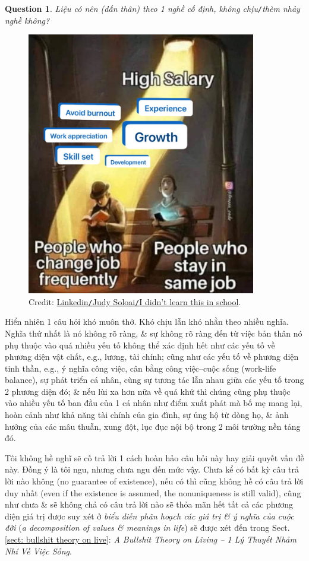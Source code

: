 \documentclass[12pt,oneside]{book}
\newtheorem{question}{Question}
\begin{document}
\begin{question}
	Liệu có nên (dấn thân) theo 1 nghề cố định, không chịu{\tt/}thèm nhảy nghề không? 
\end{question}

\begin{figure}[H]
	\centering
	\includegraphics[width = 10cm]{high_salary}
	\caption{Credit: \href{https://www.linkedin.com/posts/judy-soloai_i-didnt-learn-this-in-school-i-learned-activity-7089014937494179840-jTze/}{Linkedin{\tt/}Judy Soloai{\tt/}I didn't learn this in school}.}
\end{figure}
Hiển nhiên 1 câu hỏi khó muôn thở. Khó chịu lẫn khó nhằn theo nhiều nghĩa. Nghĩa thứ nhất là nó không rõ ràng, \& sự không rõ ràng đến từ việc bản thân nó phụ thuộc vào quá nhiều yếu tố không thể xác định hết như các yếu tố về phương diện vật chất, e.g., lương, tài chính; cũng như các yếu tố về phương diện tinh thần, e.g., ý nghĩa công việc, cân bằng công việc--cuộc sống (work-life balance), sự phát triển cá nhân, cùng sự tương tác lẫn nhau giữa các yếu tố trong 2 phương diện đó; \& nếu lùi xa hơn nữa về quá khứ thì chúng cũng phụ thuộc vào nhiều yếu tố ban đầu của 1 cá nhân như điểm xuất phát mà bố mẹ mang lại, hoàn cảnh như khả năng tài chính của gia đình, sự ủng hộ từ dòng họ, \& ảnh hưởng của các mâu thuẫn, xung đột, lục đục nội bộ trong 2 môi trường nền tảng đó.

Tôi không hề nghĩ sẽ cố trả lời 1 cách hoàn hảo câu hỏi này hay giải quyết vấn đề này. Đồng ý là tôi ngu, nhưng chưa ngu đến mức vậy. Chưa kể có bất kỳ câu trả lời nào không (no guarantee of existence), nếu có thì cũng không hề có câu trả lời duy nhất (even if the existence is assumed, the nonuniqueness is still valid), cũng như chưa \& sẽ không chả có câu trả lời nào sẽ thỏa mãn hết tất cả các phương diện giá trị được suy xét ở {\it biểu diễn phân hoạch các giá trị \& ý nghĩa của cuộc đời} ({\it a decomposition of values \& meanings in life}) sẽ được xét đến trong Sect. \ref{sect: bullshit theory on live}: {\it A Bullshit Theory on Living -- 1 Lý Thuyết Nhảm Nhí Về Việc Sống}.
\end{document}
